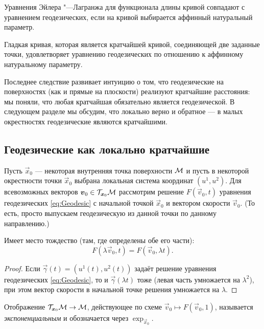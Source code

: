 \begin{theorem}
	Уравнения Эйлера "---Лагранжа для функционала длины кривой совпадают с уравнением геодезических, если на кривой выбирается аффинный натуральный параметр.
\end{theorem}

\begin{corollary}
	Гладкая кривая, которая является кратчайшей кривой, соединяющей две заданные точки, удовлетворяет уравнению геодезических по отношению к аффинному натуральному параметру.
\end{corollary}

Последнее следствие развивает интуицию о том, что геодезические на поверхностях (как и прямые на плоскости) реализуют кратчайшие расстояния: мы поняли, что любая кратчайшая обязательно является геодезической. В следующем разделе мы обсудим, что локально верно и обратное --- в малых окрестностях геодезические являются кратчайшими.

\subsection{Геодезические как локально кратчайшие}

Пусть $\vec{x}_0$ --- некоторая внутренняя точка поверхности $\mathcal{M}$ и пусть в некоторой окрестности точки $\vec{x}_0$ выбрана локальная система координат $(u^1, u^2)$. Для всевозможных векторов $\boldsymbol{v}_0 \in \mathcal{T}_{\boldsymbol{x}_0}\mathcal{M}$ рассмотрим решение $F(\vec{v}_0, t)$ уравнения геодезических \eqref{eq:Geodesic} с начальной точкой $\vec{x}_0$ и вектором скорости $\vec{v}_0$. (То есть, просто выпускаем геодезическую из данной точки по данному направлению.)

\begin{proposition}
	Имеет место тождество (там, где определены обе его части):
	\[
		F(\lambda\vec{v}_0, t) = F(\vec{v}_0, \lambda t).
	\]
\end{proposition}

\begin{proof}
	Если $\vec{\gamma}(t) = (u^1(t), u^2(t))$ задаёт решение уравнения геодезических \eqref{eq:Geodesic}, то и $\vec{\gamma}(\lambda t)$ тоже (левая часть умножается на $\lambda^2$), при этом вектор скорости в начальной точке решения умножается на $\lambda$.
\end{proof}

\begin{definition}
	Отображение $\mathcal{T}_{\boldsymbol{x}_0}\mathcal{M} \to \mathcal{M}$, действующее по схеме $\vec{v}_0 \mapsto F(\vec{v}_0, 1)$, называется \textit{экспоненциальным} и обозначается через $\exp_{\vec{x}_0}$.
\end{definition}

